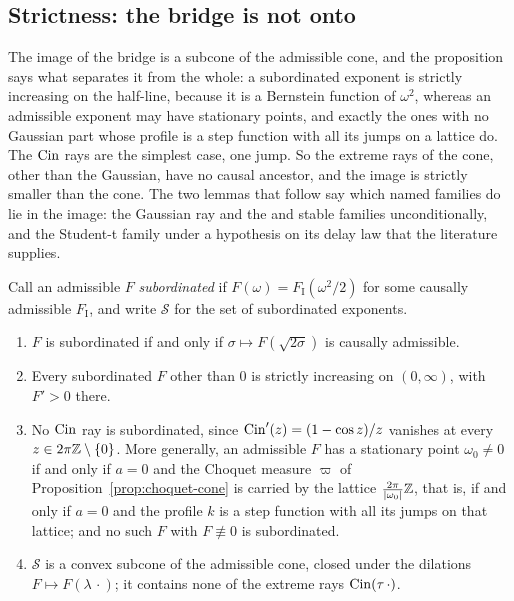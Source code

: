 \subsection{Strictness: the bridge is not onto}\label{sec:bridge-strictness}

The image of the bridge is a subcone of the admissible cone, and the proposition says what
separates it from the whole: a subordinated exponent is strictly increasing on the half-line,
because it is a Bernstein function of $\omega^2$, whereas an admissible exponent may have
stationary points, and exactly the ones with no Gaussian part whose profile is a step function with all its jumps
on a lattice do. The $\operatorname{Cin}$ rays are the simplest case, one jump. So the extreme rays of the
cone, other than the Gaussian, have no causal ancestor, and the image is strictly smaller than
the cone. The two lemmas that follow say which named families do lie in the image: the
Gaussian ray and the \Matern{} and stable families unconditionally, and the Student-t family
under a hypothesis on its delay law that the literature supplies.

\begin{proposition}\label{prop:bridge-strictness}
Call an admissible $F$ \emph{subordinated} if $F(\omega) = F_{\mathrm I}(\omega^2/2)$ for some
causally admissible $F_{\mathrm I}$, and write $\mathcal{S}$ for the set of subordinated
exponents.
\begin{enumerate}
\item $F$ is subordinated if and only if $\sigma \mapsto F(\sqrt{2\sigma})$ is causally
admissible.
\item Every subordinated $F$ other than $0$ is strictly increasing on $(0,\infty)$, with
$F' > 0$ there.
\item No $\operatorname{Cin}$ ray is subordinated, since $\operatorname{Cin}'(z) = (1 - \cos z)/z$ vanishes at every
$z \in 2\pi\mathbb{Z} \setminus \{0\}$. More generally, an admissible $F$ has a stationary point
$\omega_0 \ne 0$ if and only if $a = 0$ and the Choquet measure $\varpi$ of
Proposition~\ref{prop:choquet-cone} is carried by the lattice $\tfrac{2\pi}{|\omega_0|}\mathbb{Z}$,
that is, if and only if $a = 0$ and the profile $k$ is a step function with all its jumps on that lattice;
and no such $F$ with $F \not\equiv 0$ is subordinated.
\item $\mathcal{S}$ is a convex subcone of the admissible cone, closed under the dilations
$F \mapsto F(\lambda\,\cdot)$; it contains none of the extreme rays $\operatorname{Cin}(\tau\,\cdot)$.
\end{enumerate}
\end{proposition}


